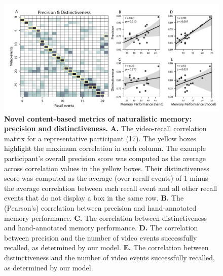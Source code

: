 \documentclass{article}
\begin{document}
\begin{figure}[t]
  \centering
  \includegraphics[width=1\textwidth]{figs/precision_distinctiveness}
  \caption{\small \textbf{Novel content-based metrics of naturalistic memory: precision and distinctiveness.} \textbf{A.} The video-recall correlation matrix for a representative participant (17).  The yellow boxes highlight the maximum correlation in each column.  The example participant's overall precision score was computed as the average across correlation values in the yellow boxes.  Their distinctiveness score was computed as the average (over recall events) of 1 minus the average correlation between each recall event and all other recall events that do not display a box in the same row.  \textbf{B.} The (Pearson's) correlation between precision and hand-annotated memory performance. \textbf{C.} The correlation between distinctiveness and hand-annotated memory performance. \textbf{D.} The correlation between precision and the number of video events successfully recalled, as determined by our model. \textbf{E.} The correlation between distinctiveness and the number of video events successfully recalled, as determined by our model.}
  \label{fig:precision-distinctiveness}
\end{figure}
\end{document}
